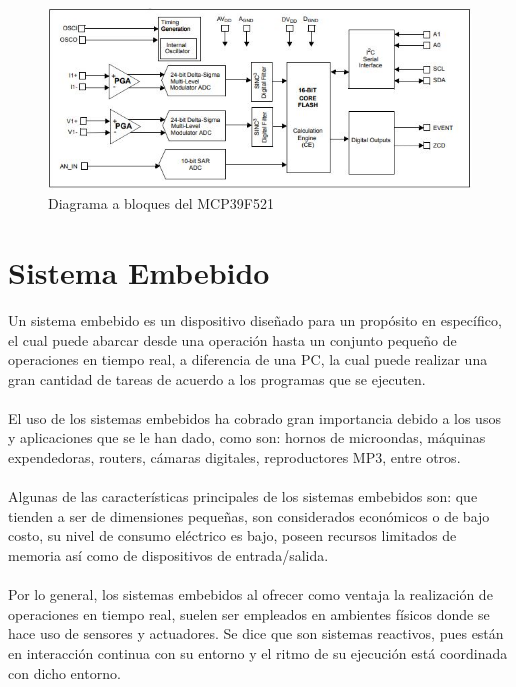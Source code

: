 \paragraph{}
\begin{figure}[H]
	\centering
	\includegraphics[scale=.9]{Capitulo2/images/DiagramaDispMonitoreo.JPG}
	\caption{Diagrama a bloques del MCP39F521}
	\label{fig:diagrama_dispMonitoreo}
\end{figure}


\section{Sistema Embebido}
Un sistema embebido es un dispositivo diseñado para un propósito en específico, el cual puede abarcar desde una operación hasta un conjunto pequeño de operaciones en tiempo real, a diferencia de una PC, la cual puede realizar una gran cantidad de tareas de acuerdo a los programas que se ejecuten. 
\paragraph{}
El uso de los sistemas embebidos ha cobrado gran importancia debido a los usos y aplicaciones que se le han dado, como son: hornos de microondas, máquinas expendedoras, routers, cámaras digitales, reproductores MP3, entre otros. 
\paragraph{}
Algunas de las características principales de los sistemas embebidos son: que tienden a ser de dimensiones pequeñas, son considerados económicos o de bajo costo, su nivel de consumo eléctrico es bajo, poseen recursos limitados de memoria así como de dispositivos de entrada/salida.\citep{MarcoTeorico14}
\paragraph{}
Por lo general, los sistemas embebidos al ofrecer como ventaja la realización de operaciones en tiempo real, suelen ser empleados en ambientes físicos donde se hace uso de sensores y actuadores. Se dice que son sistemas reactivos, pues están en interacción continua con su entorno y el ritmo de su ejecución está coordinada con dicho entorno. 
